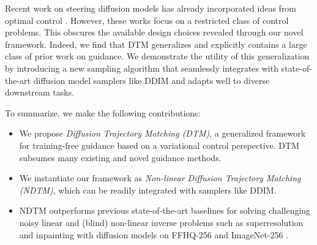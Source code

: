Recent work on steering diffusion models has already incorporated ideas from optimal control \citep{HuangGLHZSGOY24, rout2024rbmodulationtrainingfreepersonalizationdiffusion}. However, these works focus on a restricted class of control problems. This obscures the available design choices revealed through our novel framework. Indeed, we find that DTM generalizes and explicitly contains a large class of prior work on guidance. We demonstrate the utility of this generalization by introducing a new sampling algorithm that seamlessly integrates with state-of-the-art diffusion model samplers like DDIM \citep{song2022denoisingdiffusionimplicitmodels} and adapts well to diverse downstream tasks.

To summarize, we make the following contributions:


\begin{itemize}
    \item We propose \emph{Diffusion Trajectory Matching (DTM)}, a generalized framework for training-free guidance based on a variational control perspective. DTM subsumes many existing and novel guidance methods.

    \item We instantiate our framework as \emph{Non-linear Diffusion Trajectory Matching (NDTM)}, which can be readily integrated with samplers like DDIM.

    \item NDTM outperforms previous state-of-the-art baselines for solving challenging noisy linear and (blind) non-linear inverse problems such as superresolution and inpainting with diffusion models \citep{daras2024surveydiffusionmodelsinverse} on FFHQ-256 \citep{8977347} and ImageNet-256 \citep{deng2009imagenet}. 
\end{itemize}

